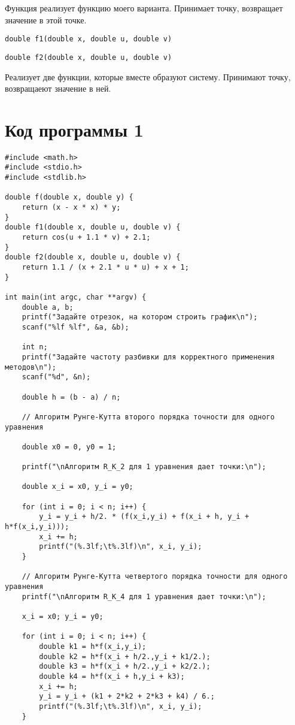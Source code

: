 \documentclass[a4paper,12pt,titlepage,finall]{article}
\begin{document}
Функция реализует функцию моего варианта. Принимает точку, возвращает значение в этой точке.

\begin{verbatim}
double f1(double x, double u, double v)
\end{verbatim}

\begin{verbatim}
double f2(double x, double u, double v)
\end{verbatim}

Реализует две функции, которые вместе образуют систему. Принимают точку, возвращаеют значение в ней.

\newpage
\section{Код программы 1}
\begin{lstlisting}
#include <math.h>
#include <stdio.h>
#include <stdlib.h>

double f(double x, double y) {
    return (x - x * x) * y;
}
double f1(double x, double u, double v) {
	return cos(u + 1.1 * v) + 2.1;
}
double f2(double x, double u, double v) {
	return 1.1 / (x + 2.1 * u * u) + x + 1;
}

int main(int argc, char **argv) {
	double a, b;
	printf("Задайте отрезок, на котором строить график\n");
	scanf("%lf %lf", &a, &b);

	int n;
	printf("Задайте частоту разбивки для корректного применения методов\n");
	scanf("%d", &n);

	double h = (b - a) / n;
	
	// Алгоритм Рунге-Кутта второго порядка точности для одного уравнения

	double x0 = 0, y0 = 1;
	
	printf("\nАлгоритм R_K_2 для 1 уравнения дает точки:\n");
	
	double x_i = x0, y_i = y0;

	for (int i = 0; i < n; i++) {
		y_i = y_i + h/2. * (f(x_i,y_i) + f(x_i + h, y_i + h*f(x_i,y_i)));
		x_i += h;
		printf("(%.3lf;\t%.3lf)\n", x_i, y_i);
	}

	// Алгоритм Рунге-Кутта четвертого порядка точности для одного уравнения
	printf("\nАлгоритм R_K_4 для 1 уравнения дает точки:\n");

	x_i = x0; y_i = y0;

	for (int i = 0; i < n; i++) {
		double k1 = h*f(x_i,y_i);
		double k2 = h*f(x_i + h/2.,y_i + k1/2.);
		double k3 = h*f(x_i + h/2.,y_i + k2/2.);
		double k4 = h*f(x_i + h,y_i + k3);
		x_i += h;
		y_i = y_i + (k1 + 2*k2 + 2*k3 + k4) / 6.;
		printf("(%.3lf;\t%.3lf)\n", x_i, y_i);
	}
	

\end{lstlisting}
\end{document}
